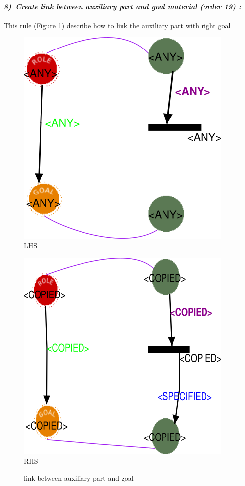 \paragraph{\emph{8)~Create link between auxiliary part and  goal material  (order 19) :} }
 
 
This rule (Figure \ref{fig:link between auxiliary part and goal}) describe 
how to link the auxiliary part with right goal  
\vspace{1cm}
\begin{figure}[th]
\centering
\begin{minipage}{.5\textwidth}
  \begin{center}
  \includegraphics[width=.7\linewidth]{chapiter3/img/L8}
  LHS
  \end{center}
  
\end{minipage}%
\begin{minipage}{.5\textwidth}
  \begin{center}
  \includegraphics[width=.7\linewidth]{chapiter3/img/R8}
  RHS 
  \end{center}
\end{minipage}
\caption{\label{fig:link between auxiliary part and goal}link between auxiliary part and goal}
 
\end{figure}

